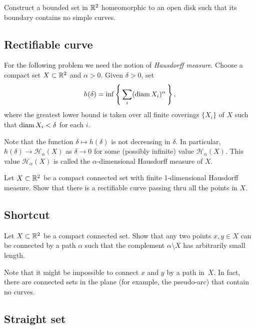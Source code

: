 \begin{pr}
Construct 
a bounded set in $\mathbb{R}^2$
homeomorphic to an open disk
such that 
its boundary contains no simple curves.
\end{pr}

\subsection*{Rectifiable curve}
\label{Rectifiable curve}

For the following problem we need the notion of 
\emph{Hausdorff measure}.
Choose a compact set $X\subset\mathbb{R}^2$ and $\alpha>0$.
Given $\delta>0$, set
\[h(\delta)=\inf\left\{\,\sum_i(\operatorname{\rm diam}\nolimits X_i)^\alpha\,\right\},\]
where the greatest lower bound is taken over all finite coverings $\{X_i\}$ of $X$ 
such that $\operatorname{\rm diam}\nolimits X_i<\delta$ for each $i$.

Note that the function $\delta\mapsto h(\delta)$ is not decreasing in $\delta$.
In particular, $h(\delta)\to \mathcal{H}_\alpha(X)$ as $\delta\to 0$ for some (possibly infinite) value $\mathcal{H}_\alpha(X)$.
This value $\mathcal{H}_\alpha(X)$ is called the $\alpha$-dimensional Hausdorff measure of $X$.

\begin{pr}
Let $X\subset \mathbb{R}^2$ be a compact connected set
with finite 1-dimensional Hausdorff measure. 
Show that there is a rectifiable curve passing thru all the points in $X$.
\end{pr}

\subsection*{Shortcut\hard}

\begin{pr}
Let $X\subset \mathbb{R}^2$ be a compact connected set. 
Show that any two points $x,y\in X$ can be connected by a path $\alpha$ such that the complement $\alpha\setminus X$ has arbitrarily small length.
\end{pr}

Note that it might be impossible to connect $x$ and $y$ by a path in~$X$.
In fact, there are connected sets in the plane (for example, the pseudo-arc) that contain no curves.

\subsection*{Straight set}

